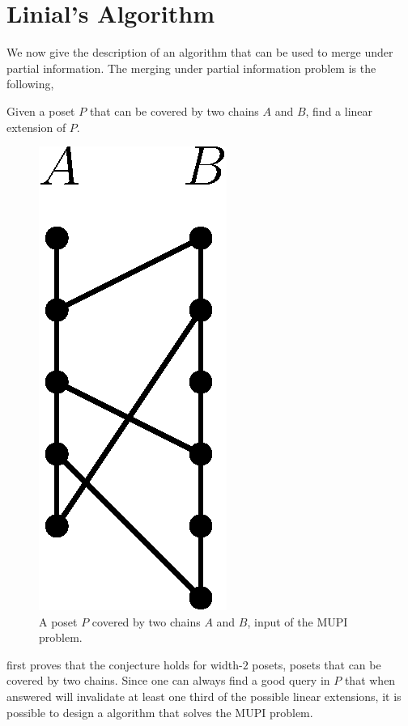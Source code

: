 \section{Linial's Algorithm}

We now give the description of an algorithm that can be used to merge under
partial information. The merging under partial information problem is the
following,

\begin{problem}
Given a poset \(P\) that can be covered by two chains \(A\) and \(B\), find a
linear extension of \(P\).
\end{problem}

\begin{figure}
\centering
\includegraphics[height=0.2\textheight]{fig/supi/mupi}
\caption{A poset \(P\) covered by two chains \(A\) and \(B\),
input of the MUPI problem.}
\label{fig:supi:mupi}
\end{figure}

\citet*{linial:1984} first proves that the \onethirdtwothird conjecture holds
for width-\(2\) posets, \ie posets that can be covered by two chains. Since one
can always find a good query in \(P\) that when answered will invalidate at
least one third of the possible linear extensions, it is possible to design a
 algorithm that solves the MUPI problem.

